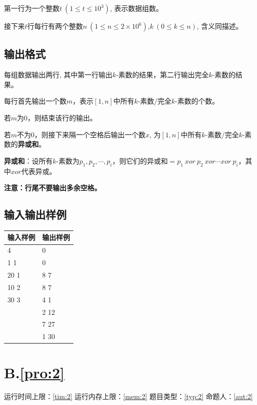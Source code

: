 \documentclass[
	lang=cn,
	color=green
]{elegantbook}
\begin{document}
第一行为一个整数$t~(1\leq t\leq 10^3)$, 表示数据组数。

接下来$t$行每行有两个整数$n~(1\leq n\leq 2\times 10^6)$,$k~(0\leq k\leq n)$, 含义同描述。


\section*{输出格式}
每组数据输出两行, 其中第一行输出$k$-素数的结果，第二行输出完全$k$-素数的结果。

每行首先输出一个数$m$，表示$[1,n]$中所有$k$-素数/完全$k$-素数的个数。

若$m$为$0$，则结束该行的输出。

若$m$不为$0$，则接下来隔一个空格后输出一个数$x$, 为$[1,n]$中所有$k$-素数/完全$k$-素数的\textbf{异或和}。

\begin{remark}
    \hspace{0.15cm} \textbf{异或和}：设所有$k$-素数为$p_1,p_2, \cdots , p_i$，则它们的异或和$=p_1 \ xor \ p_2 \ xor  \cdots xor \ p_i$，其中$xor$代表异或。
\end{remark}

\textbf{注意：行尾不要输出多余空格。}

\section*{输入输出样例}
\begin{tabularx}{450pt}{X|X}
    \toprule
    输入样例 & 输出样例 \\
    \midrule
    4        & 0        \\
    1 1      & 0        \\
    20 1     & 8 7      \\
    10 2     & 8 7      \\
    30 3     & 4 1      \\
             & 2 12     \\
             & 7 27     \\
             & 1 30     \\
    \bottomrule
\end{tabularx}

\newpage
\chapter*{B.\quad \ref*{pro:2}}
\begin{center}
    运行时间上限：\ref*{tim:2} \quad 运行内存上限：\ref*{mem:2} \quad 题目类型：\ref*{typ:2} \quad 命题人：\ref*{aut:2}
\end{center}
\end{document}
